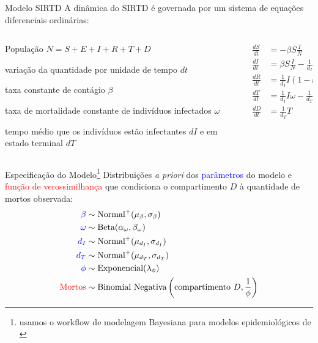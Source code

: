 \documentclass[aspectratio=169]{beamer}                    %
\begin{document}
\begin{frame}{Modelo SIRTD}
    A dinâmica do SIRTD é governada por um sistema de equações diferenciais ordinárias:
    \begin{columns}
        \begin{column}{0.5\textwidth}
            \begin{vfilleditems}
                \item População $N = S +E + I + R + T + D$
                \item variação da quantidade por unidade de tempo $dt$
                \item taxa constante de contágio $\beta$
                \item taxa de mortalidade constante de indivíduos infectados $\omega$
                \item tempo médio que os indivíduos estão infectantes $dI$ e em estado terminal $dT$
            \end{vfilleditems}
        \end{column}
        \begin{column}{0.5\textwidth}
            \begin{align*}
                \frac{dS}{dt} &= -\beta  S \frac{I}{N}\\
                \frac{dI}{dt} &= \beta  S  \frac{I}{N} - \frac{1}{d_I}  I \\
                \frac{dR}{dt} &= \frac{1}{d_I} I \left( 1 - \omega \right) \\
                \frac{dT}{dt} &= \frac{1}{d_I} I \omega - \frac{1}{d_T} T \\
                \frac{dD}{dt} &= \frac{1}{d_T} T \\
            \end{align*}
        \end{column}
    \end{columns}
\end{frame}

\begin{frame}{Especificação do Modelo\footnote{usamos o workflow de modelagem Bayesiana para modelos epidemiológicos de \textcite{grinsztajnBayesianWorkflowDisease2021}}}
    Distribuições \textit{a priori} dos \textcolor{blue}{parâmetros} do modelo e \textcolor{red}{função de verossimilhança} que condiciona o compartimento $D$ à quantidade de mortos observada:
    \begin{align*}
        \textcolor{blue}{\beta} &\sim \text{Normal}^+(\mu_\beta, \sigma_\beta) \\
        \textcolor{blue}{\omega} &\sim \text{Beta}(\alpha_\omega, \beta_\omega) \\
        \textcolor{blue}{d_I} &\sim \text{Normal}^+(\mu_{d_I}, \sigma_{d_I}) \\
        \textcolor{blue}{d_T} &\sim \text{Normal}^+(\mu_{d_T}, \sigma_{d_T}) \\
        \textcolor{blue}{\phi} &\sim \text{Exponencial}(\lambda_\phi) \\
        \textcolor{red}{\text{Mortos}} &\sim \text{Binomial Negativa}\left(\text{compartimento $D$}, \frac{1}{\phi}\right)
    \end{align*}
\end{frame}
\end{document}
